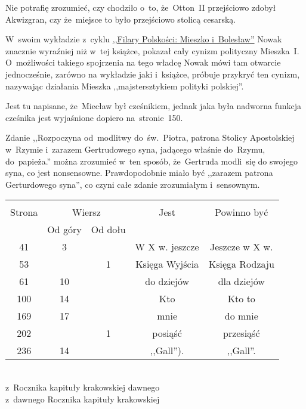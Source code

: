 \documentclass[a4paper,11pt]{article}
\begin{document}
\vspace{\spaceFour}


\start {} Nie potrafię zrozumieć, czy chodziło o~to,
że~Otton~II przejściowo zdobył Akwizgran, czy że~miejsce to było
przejściowo stolicą cesarską.

\vspace{\spaceFour}


\start {} W~swoim wykładzie z~cyklu
\href{https://www.youtube.com/watch?v=QovVLT2fitc}{,,Filary Polskości:
  Mieszko i~Bolesław''} Nowak znacznie wyraźniej niż w~tej książce,
pokazał cały cynizm polityczny Mieszka~I. O~możliwości takiego
spojrzenia na tego władcę Nowak mówi tam otwarcie jednocześnie,
zarówno na wykładzie jaki i~książce, próbuje przykryć ten cynizm,
nazywając działania Mieszka ,,majstersztykiem polityki polskiej''.

\vspace{\spaceFour}


\start {} Jest tu napisane, że~Miecław był cześnikiem,
jednak jaka była nadworna funkcja cześnika jest wyjaśnione dopiero
na~stronie~150.

\vspace{\spaceFour}


\start {} Zdanie ,,Rozpoczyna od~modlitwy
do~św.~Piotra, patrona Stolicy Apostolskiej w~Rzymie i~zarazem
Gertrudowego syna, jadącego właśnie do~Rzymu, do~papieża.'' można
zrozumieć w~ten sposób, że~Gertruda modli~się do swojego syna, co jest
nonsensowne. Prawdopodobnie miało być ,,zarazem patrona Gerturdowego
syna'', co czyni całe zdanie zrozumiałym i~sensownym.


\begin{center}
  \begin{tabular}{|c|c|c|c|c|}
    \hline
    & \multicolumn{2}{c|}{} & & \\
    Strona & \multicolumn{2}{c|}{Wiersz}& Jest & Powinno być \\ \cline{2-3}
    & Od góry & Od dołu &  &  \\ \hline
    41  &  3 & & W X w. jeszcze & Jeszcze w X w. \\
    53  & &  1 & Księga Wyjścia & Księga Rodzaju \\
    61  & 10 & & do dziejów & dla dziejów \\
    100 & 14 & & Kto & Kto to \\
    169 & 17 & & mnie & do mnie \\
    202 & &  1 & posiąść & przesiąść \\
    236 & 14 & & ,,Gall''). & ,,Gall''. \\
    \hline
  \end{tabular}
\end{center}
\noi
{} \\
\Jest z~Rocznika kapituły krakowskiej dawnego \\
\Pow  z~dawnego Rocznika kapituły krakowskiej \\
\end{document}
